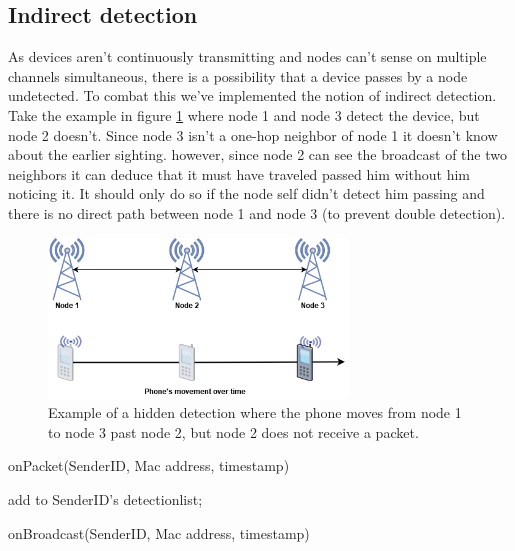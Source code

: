 \documentclass{IEEEtran}
\begin{document}
\subsection{Indirect detection}
As devices aren't continuously transmitting and nodes can't sense on multiple channels simultaneous, there is a possibility that a device passes by a node undetected. To combat this we've implemented the notion of indirect detection. Take the example in figure \ref{fig:indirect} where node 1 and node 3 detect the device, but node 2 doesn't. Since node 3 isn't a one-hop neighbor of node 1 it doesn't know about the earlier sighting. however, since node 2 can see the broadcast of the two neighbors it can deduce that it must have traveled passed him without him noticing it. It should only do so if the node self didn't detect him passing and there is no direct path between node 1 and node 3 (to prevent double detection). %

\begin{figure}
    \centering
    \includegraphics[width=80mm]{images/indirectdetection.png}
    \caption{Example of a hidden detection where the phone moves from node 1 to node 3 past node 2, but node 2 does not receive a packet.}
    \label{fig:indirect}
\end{figure}


\begin{algorithm}
 \caption{onPacket(SenderID, Mac address, timestamp)}
\end{algorithm}


\begin{algorithm}

add to SenderID's detectionlist;
 \caption{onBroadcast(SenderID, Mac address, timestamp)}
\end{algorithm}
\end{document}
